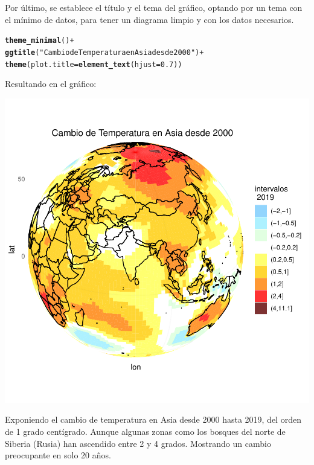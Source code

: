 \documentclass{article}\usepackage[]{graphicx}\usepackage[]{color}
\makeatletter
\def\maxwidth{ %
  \ifdim\Gin@nat@width>\linewidth
    \linewidth
  \else
    \Gin@nat@width
  \fi
}
\newcommand{\hlnum}[1]{\textcolor[rgb]{0.686,0.059,0.569}{#1}}%
\newcommand{\hlstr}[1]{\textcolor[rgb]{0.192,0.494,0.8}{#1}}%
\newcommand{\hlopt}[1]{\textcolor[rgb]{0,0,0}{#1}}%
\newcommand{\hlstd}[1]{\textcolor[rgb]{0.345,0.345,0.345}{#1}}%
\newcommand{\hlkwc}[1]{\textcolor[rgb]{0.333,0.667,0.333}{#1}}%
\newcommand{\hlkwd}[1]{\textcolor[rgb]{0.737,0.353,0.396}{\textbf{#1}}}%
\newenvironment{kframe}{%
 \def\at@end@of@kframe{}%
 \ifinner\ifhmode%
  \def\at@end@of@kframe{\end{minipage}}%
  \begin{minipage}{\columnwidth}%
 \fi\fi%
 \def\FrameCommand##1{\hskip\@totalleftmargin \hskip-\fboxsep
 \colorbox{shadecolor}{##1}\hskip-\fboxsep
     \hskip-\linewidth \hskip-\@totalleftmargin \hskip\columnwidth}%
 \MakeFramed {\advance\hsize-\width
   \@totalleftmargin\z@ \linewidth\hsize
   \@setminipage}}%
 {\par\unskip\endMakeFramed%
 \at@end@of@kframe}
\newenvironment{knitrout}{}{} %
\makeatother
\begin{document}
Por \'ultimo, se establece el t\'itulo y el tema del gr\'afico, optando por un tema con el m\'inimo de datos, para tener un diagrama limpio y con los datos necesarios.
\begin{knitrout}
\color{fgcolor}\begin{kframe}
\begin{alltt}
    \hlkwd{theme_minimal}\hlstd{()} \hlopt{+}
    \hlkwd{ggtitle}\hlstd{(}\hlstr{"Cambio de Temperatura en Asia desde 2000"}\hlstd{)} \hlopt{+}
    \hlkwd{theme}\hlstd{(}\hlkwc{plot.title} \hlstd{=} \hlkwd{element_text}\hlstd{(}\hlkwc{hjust} \hlstd{=} \hlnum{0.7}\hlstd{))}
\end{alltt}
\end{kframe}
\end{knitrout}
Resultando en el gr\'afico:
\begin{knitrout}
\color{fgcolor}

{\centering \includegraphics[width=\maxwidth]{figure/plot_esfe_gg-1} 

}



\end{knitrout}
Exponiendo el cambio de temperatura en Asia desde 2000 hasta 2019, del orden de 1 grado cent\'igrado. Aunque algunas zonas como los bosques del norte de Siberia (Rusia) han ascendido entre 2 y 4 grados. Mostrando un cambio preocupante en solo 20 a\~nos.
\clearpage
\end{document}
